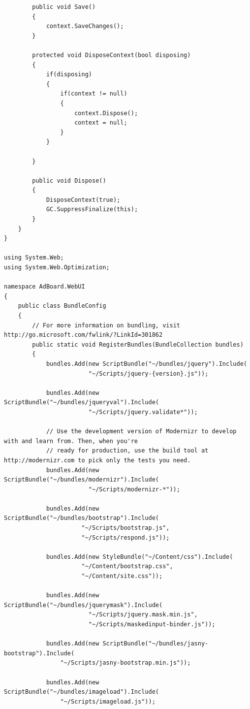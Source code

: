 \documentclass[14pt,a4paper]{extreport}
\begin{document}
\begin{lstlisting}
        public void Save()
        {
            context.SaveChanges();
        }

        protected void DisposeContext(bool disposing)
        {
            if(disposing)
            {
                if(context != null)
                {
                    context.Dispose();
                    context = null;
                }
            }

        }

        public void Dispose()
        {
            DisposeContext(true);
            GC.SuppressFinalize(this);
        }
    }
}

using System.Web;
using System.Web.Optimization;

namespace AdBoard.WebUI
{
    public class BundleConfig
    {
        // For more information on bundling, visit http://go.microsoft.com/fwlink/?LinkId=301862
        public static void RegisterBundles(BundleCollection bundles)
        {
            bundles.Add(new ScriptBundle("~/bundles/jquery").Include(
                        "~/Scripts/jquery-{version}.js"));

            bundles.Add(new ScriptBundle("~/bundles/jqueryval").Include(
                        "~/Scripts/jquery.validate*"));

            // Use the development version of Modernizr to develop with and learn from. Then, when you're
            // ready for production, use the build tool at http://modernizr.com to pick only the tests you need.
            bundles.Add(new ScriptBundle("~/bundles/modernizr").Include(
                        "~/Scripts/modernizr-*"));

            bundles.Add(new ScriptBundle("~/bundles/bootstrap").Include(
                      "~/Scripts/bootstrap.js",
                      "~/Scripts/respond.js"));

            bundles.Add(new StyleBundle("~/Content/css").Include(
                      "~/Content/bootstrap.css",
                      "~/Content/site.css"));

            bundles.Add(new ScriptBundle("~/bundles/jquerymask").Include(
                        "~/Scripts/jquery.mask.min.js",
                        "~/Scripts/maskedinput-binder.js"));

            bundles.Add(new ScriptBundle("~/bundles/jasny-bootstrap").Include(
                "~/Scripts/jasny-bootstrap.min.js"));

            bundles.Add(new ScriptBundle("~/bundles/imageload").Include(
                "~/Scripts/imageload.js"));


\end{lstlisting}
\end{document}
